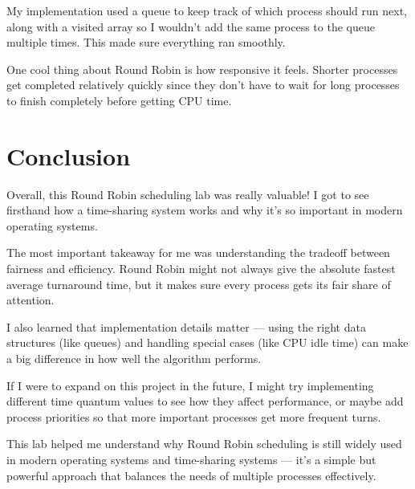 \documentclass[12pt,a4paper]{article}
\begin{document}
My implementation used a queue to keep track of which process should run next, along with a visited array so I wouldn't add the same process to the queue multiple times. This made sure everything ran smoothly.

One cool thing about Round Robin is how responsive it feels. Shorter processes get completed relatively quickly since they don't have to wait for long processes to finish completely before getting CPU time.

\section{Conclusion}
Overall, this Round Robin scheduling lab was really valuable! I got to see firsthand how a time-sharing system works and why it's so important in modern operating systems.

The most important takeaway for me was understanding the tradeoff between fairness and efficiency. Round Robin might not always give the absolute fastest average turnaround time, but it makes sure every process gets its fair share of attention.

I also learned that implementation details matter --- using the right data structures (like queues) and handling special cases (like CPU idle time) can make a big difference in how well the algorithm performs.

If I were to expand on this project in the future, I might try implementing different time quantum values to see how they affect performance, or maybe add process priorities so that more important processes get more frequent turns.

This lab helped me understand why Round Robin scheduling is still widely used in modern operating systems and time-sharing systems --- it's a simple but powerful approach that balances the needs of multiple processes effectively.
\end{document}
